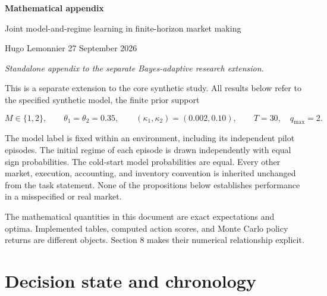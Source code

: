 \documentclass[10pt,a4paper]{article}
\begin{document}
{\LARGE\bfseries Mathematical appendix\par}
\vspace{2pt}
{\large Joint model-and-regime learning in finite-horizon market making\par}
\vspace{4pt}
Hugo Lemonnier \hfill 27 September 2026\par
\textit{Standalone appendix to the separate Bayes-adaptive research extension.}
\par
\begin{abstract}
This document gives the joint filter, exact finite-horizon recursion, model-only revelation hierarchy, information identities, matched planning interventions, and conservative interpolation and quadrature error allowances for the prespecified two-model synthetic market. Analytic inequalities concern exact expectations. Reported numerical quadrature distances and computed control tables require separate error accounting; no final economic outcome or numerical convergence claim is made here.
\end{abstract}
\vspace{3pt}

This is a separate extension to the core synthetic study. All results below
refer to the specified synthetic model, the finite prior support

\begin{equation*}
M\in\{1,2\},\qquad \theta_1=\theta_2=0.35,\qquad
(\kappa_1,\kappa_2)=(0.002,0.10),\qquad T=30,\quad q_{\max}=2.
\end{equation*}

The model label is fixed within an environment, including its independent pilot
episodes. The initial regime of each episode is drawn independently with equal
sign probabilities. The cold-start model probabilities are equal. Every other
market, execution, accounting, and inventory convention is inherited unchanged
from the task statement. None of the propositions below establishes performance
in a misspecified or real market.

The mathematical quantities in this document are exact expectations and optima.
Implemented tables, computed action scores, and Monte Carlo policy returns are
different objects. Section 8 makes their numerical relationship explicit.

\section{Decision state and chronology}
\end{document}
